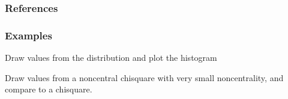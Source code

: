 \documentclass[letterpaper,10pt,english]{sphinxmanual}
\begin{document}
\begin{fulllineitems}
\subsubsection*{References}
\subsubsection*{Examples}

\sphinxAtStartPar
Draw values from the distribution and plot the histogram

\begin{sphinxVerbatim}[commandchars=\\\{\}]
   
    
                   
\end{sphinxVerbatim}

\sphinxAtStartPar
Draw values from a noncentral chisquare with very small noncentrality,
and compare to a chisquare.


\end{fulllineitems}
\end{document}
